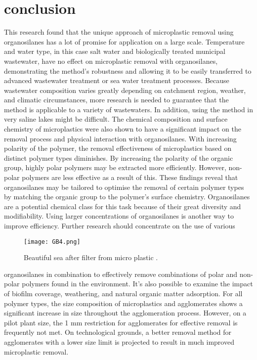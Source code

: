 \documentclass[12pt]{article}
\begin{document}
\section{conclusion}
This research found that the unique approach of microplastic removal using organosilanes has a lot of promise for application on a large scale. Temperature and water type, in this case salt water and biologically treated municipal wastewater, have no effect on microplastic removal with organosilanes, demonstrating the method's robustness and allowing it to be easily transferred to advanced wastewater treatment or sea water treatment processes. Because wastewater composition varies greatly depending on catchment region, weather, and climatic circumstances, more research is needed to guarantee that the method is applicable to a variety of wastewaters. In addition, using the method in very saline lakes might be difficult. 
The chemical composition and surface chemistry of microplastics were also shown to have a significant impact on the removal process and physical interaction with organosilanes. With increasing polarity of the polymer, the removal effectiveness of microplastics based on distinct polymer types diminishes. By increasing the polarity of the organic group, highly polar polymers may be extracted more efficiently. However, non-polar polymers are less effective as a result of this. These findings reveal that organosilanes may be tailored to optimise the removal of certain polymer types by matching the organic group to the polymer's surface chemistry. Organosilanes are a potential chemical class for this task because of their great diversity and modifiability.
Using larger concentrations of organosilanes is another way to improve efficiency. Further research should concentrate on the use of various
\begin{figure}[h]
\centering
\texttt{[image: GB4.png]}
\caption{Beautiful sea after filter from micro plastic .}
\label{fig_ROB}
\end{figure}

 organosilanes in combination to effectively remove combinations of polar and non-polar polymers found in the environment. It's also possible to examine the impact of biofilm coverage, weathering, and natural organic matter adsorption. For all polymer types, the size composition of microplastics and agglomerates shows a significant increase in size throughout the agglomeration process. However, on a pilot plant size, the 1 mm restriction for agglomerates for effective removal is frequently not met. On technological grounds, a better removal method for agglomerates with a lower size limit is projected to result in much improved microplastic removal.
\end{document}
